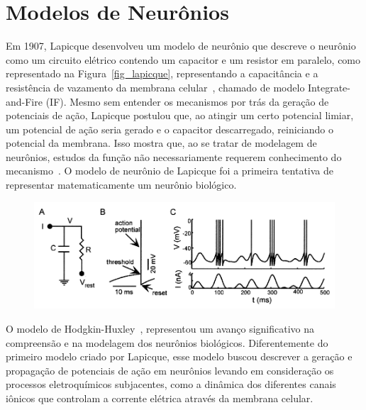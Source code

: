 \section{Modelos de Neurônios}\label{section_modelos_neuronios} 

Em 1907, Lapicque desenvolveu um modelo de neurônio que descreve o neurônio como um circuito elétrico contendo um capacitor e um
resistor em paralelo, como representado na Figura~\ref{fig_lapicque}, representando a capacitância e a resistência de vazamento da
membrana celular~\cite{lapicqueRecherches1907}, chamado de modelo Integrate-and-Fire (IF). Mesmo sem entender os mecanismos por
trás da geração de potenciais de ação, Lapicque postulou que, ao atingir um certo potencial limiar, um potencial de ação seria
gerado e o capacitor descarregado, reiniciando o potencial da membrana. Isso mostra que, ao se tratar de modelagem de neurônios,
estudos da função não necessariamente requerem conhecimento do mecanismo~\cite{abbottLapicque1999}. O modelo de neurônio de
Lapicque foi a primeira tentativa de representar matematicamente um neurônio biológico.

\begin{figure}[!ht]
\centering
\includegraphics[width=\linewidth]{figuras/lapicque.png}
\end{figure}

O modelo de Hodgkin-Huxley~\cite{hodgkinQuantitative1952}, representou um avanço significativo na compreensão e na modelagem dos
neurônios biológicos. Diferentemente do primeiro modelo criado por Lapicque, esse modelo buscou descrever a geração e propagação
de potenciais de ação em neurônios levando em consideração os processos eletroquímicos subjacentes, como a dinâmica dos diferentes
canais iônicos que controlam a corrente elétrica através da membrana celular.

